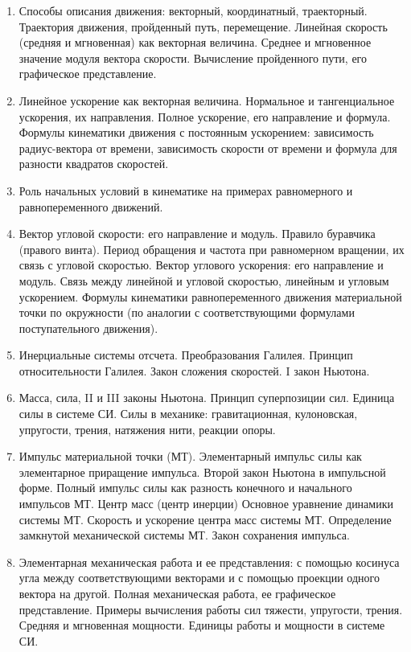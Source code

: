 \documentclass[12pt]{article}
\begin{document}
    \begin{enumerate}
        \item Способы описания движения: векторный, координатный, траекторный. Траектория движения, пройденный путь, перемещение. Линейная скорость (средняя и мгновенная) как векторная величина. Среднее и мгновенное значение модуля вектора скорости. Вычисление пройденного пути, его графическое представление.
        \item Линейное ускорение как векторная величина. Нормальное и тангенциальное ускорения, их направления. Полное ускорение, его направление и формула. Формулы кинематики движения с постоянным ускорением: зависимость радиус-вектора от времени, зависимость скорости от времени и формула для разности квадратов скоростей.
        \item Роль начальных условий в кинематике на примерах равномерного и равнопеременного движений.
        \item Вектор угловой скорости: его направление и модуль. Правило буравчика (правого винта). Период обращения и частота при равномерном вращении, их связь с угловой скоростью. Вектор углового ускорения: его направление и модуль. Связь между линейной и угловой скоростью, линейным и угловым ускорением. Формулы кинематики равнопеременного движения материальной точки по окружности (по аналогии с соответствующими формулами поступательного движения).
        \item Инерциальные системы отсчета. Преобразования Галилея. Принцип относительности Галилея. Закон сложения скоростей. I закон Ньютона.
        \item Масса, сила, II и III законы Ньютона. Принцип суперпозиции сил. Единица силы в системе СИ. Силы в механике: гравитационная, кулоновская, упругости, трения, натяжения нити, реакции опоры.
        \item Импульс материальной точки (МТ). Элементарный импульс силы как элементарное приращение импульса. Второй закон Ньютона в импульсной форме. Полный импульс силы как разность конечного и начального импульсов МТ. Центр масс (центр инерции) Основное уравнение динамики системы МТ. Скорость и ускорение центра масс системы МТ. Определение замкнутой механической системы МТ. Закон сохранения импульса.
        \item Элементарная механическая работа и ее представления: с помощью косинуса угла между соответствующими векторами и с помощью проекции одного вектора на другой. Полная механическая работа, ее графическое представление. Примеры вычисления работы сил тяжести, упругости, трения. Средняя и мгновенная мощности. Единицы работы и мощности в системе СИ.

\end{enumerate}
\end{document}
